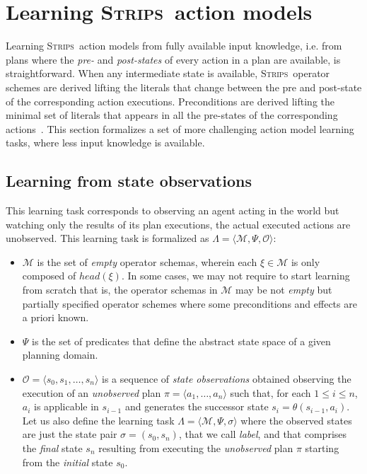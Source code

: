 \documentclass[3p,times]{elsarticle}
\newcommand{\strips}{\textsc{Strips}}     %
\newcommand{\tup}[1]{{\langle #1 \rangle}}
\begin{document}
\section{Learning \strips\ action models}
\label{sec:Section4}
Learning \strips\ action models from fully available input knowledge, i.e. from plans where the {\em pre-} and {\em post-states} of every action in a plan are available, is straightforward. When any intermediate state is available, \strips\ operator schemes are derived lifting the literals that change between the pre and post-state of the corresponding action executions. Preconditions are derived lifting the minimal set of literals that appears in all the pre-states of the corresponding actions~\cite{jimenez2012review}. This section formalizes a set of more challenging action model learning tasks, where less input knowledge is available.

\subsection{Learning from state observations} This learning task corresponds to observing an agent acting in the world but watching only the results of its plan executions, the actual executed actions are unobserved. This learning task is formalized as $\Lambda=\tup{\mathcal{M},\Psi,\mathcal{O}}$:
\begin{itemize}
\item $\mathcal{M}$ is the set of {\em empty} operator schemas, wherein each $\xi\in\mathcal{M}$ is only composed of $head(\xi)$. In some cases, we may not require to start learning from scratch that is, the operator schemas in $\mathcal{M}$ may be not {\em empty} but partially specified operator schemes where some preconditions and effects are a priori known.
\item $\Psi$ is the set of predicates that define the abstract state space of a given planning domain.
\item $\mathcal{O}=\tup{s_0,s_1,\ldots,s_{n}}$ is a sequence of {\em state observations} obtained observing the execution of an {\em unobserved} plan $\pi=\tup{a_1, \ldots, a_n}$ such that, for each {\small $1\leq i\leq n$}, $a_i$ is applicable in $s_{i-1}$ and generates the successor state $s_i=\theta(s_{i-1},a_i)$. Let us also define the learning task  $\Lambda=\tup{\mathcal{M},\Psi,\sigma}$ where the observed states are just the state pair $\sigma=(s_0,s_{n})$, that we call {\em label}, and that comprises the {\em final} state $s_{n}$ resulting from executing the {\em unobserved} plan $\pi$ starting from the {\em initial} state $s_0$. 
\end{itemize}
\end{document}
